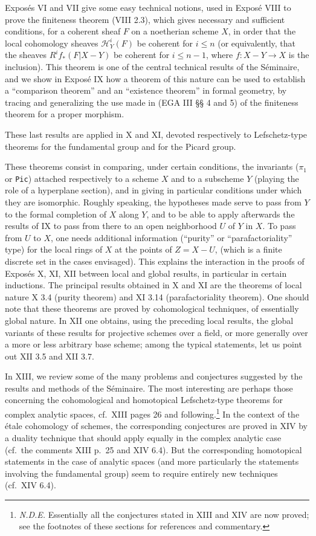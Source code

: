\documentclass[
]{article}
\begin{document}
Exposés VI and VII give some easy technical notions, used in Exposé VIII
to prove the finiteness theorem (VIII 2.3), which gives necessary and
sufficient conditions, for a coherent sheaf \(F\) on a noetherian scheme
\(X\), in order that the local cohomology sheaves
\(\mathcal{H}^{i}_{Y}(F)\) be coherent for \(i \leqslant n\) (or
equivalently, that the sheaves \(R^{i} f_{*}(F|X - Y)\) be coherent for
\(i \leqslant n - 1\), where \(f: X - Y \to X\) is the inclusion). This
theorem is one of the central technical results of the Séminaire, and we
show in Exposé IX how a theorem of this nature can be used to establish
a ``comparison theorem'' and an ``existence theorem'' in formal
geometry, by tracing and generalizing the use made in (EGA III §§ 4 and
5) of the finiteness theorem for a proper morphism.

These last results are applied in X and XI, devoted respectively to
Lefschetz-type theorems for the fundamental group and for the Picard
group.

These theorems consist in comparing, under certain conditions, the
invariants (\(\pi_{1}\) or \texttt{Pic}) attached respectively to a
scheme \(X\) and to a subscheme \(Y\) (playing the role of a hyperplane
section), and in giving in particular conditions under which they are
isomorphic. Roughly speaking, the hypotheses made serve to pass from
\(Y\) to the formal completion of \(X\) along \(Y\), and to be able to
apply afterwards the results of IX to pass from there to an open
neighborhood \(U\) of \(Y\) in \(X\). To pass from \(U\) to \(X\), one
needs additional information (``purity'' or ``parafactoriality'' type)
for the local rings of \(X\) at the points of \(Z = X - U\), (which is a
finite discrete set in the cases envisaged). This explains the
interaction in the proofs of Exposés X, XI, XII between local and global
results, in particular in certain inductions. The principal results
obtained in X and XI are the theorems of local nature X 3.4 (purity
theorem) and XI 3.14 (parafactoriality theorem). One should note that
these theorems are proved by cohomological techniques, of essentially
global nature. In XII one obtains, using the preceding local results,
the global variants of these results for projective schemes over a
field, or more generally over a more or less arbitrary base scheme;
among the typical statements, let us point out XII 3.5 and XII 3.7.

In XIII, we review some of the many problems and conjectures suggested
by the results and methods of the Séminaire. The most interesting are
perhaps those concerning the cohomological and homotopical
Lefschetz-type theorems for complex analytic spaces, cf.~XIII pages 26
and following.\footnote{\emph{N.D.E.} Essentially all the conjectures
  stated in XIII and XIV are now proved; see the footnotes of these
  sections for references and commentary.} In the context of the étale
cohomology of schemes, the corresponding conjectures are proved in XIV
by a duality technique that should apply equally in the complex analytic
case (cf.~the comments XIII p.~25 and XIV 6.4). But the corresponding
homotopical statements in the case of analytic spaces (and more
particularly the statements involving the fundamental group) seem to
require entirely new techniques (cf.~XIV 6.4).
\end{document}
